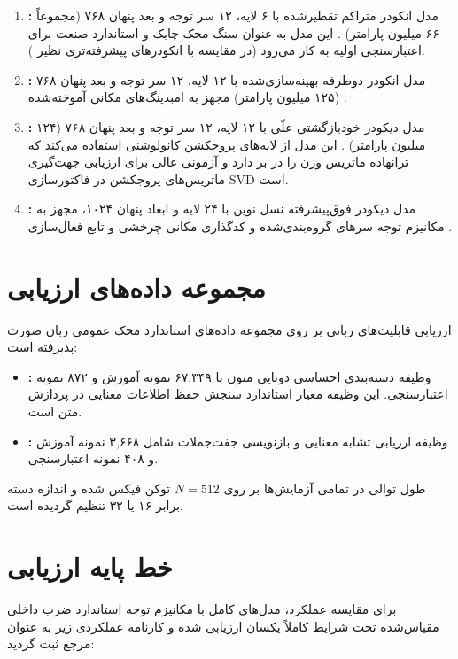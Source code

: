 \documentclass[12pt,a4paper]{report}
\theoremstyle{definition}
\begin{document}
\begin{enumerate}
    \item \textbf{:} مدل انکودر متراکم تقطیرشده با ۶ لایه، ۱۲ سر توجه و بعد پنهان ۷۶۸ (مجموعاً ۶۶ میلیون پارامتر) \cite{devlin2018bert}. این مدل به عنوان سنگ محک چابک و استاندارد صنعت برای اعتبارسنجی اولیه به کار می‌رود (در مقایسه با انکودرهای پیشرفته‌تری نظیر  \cite{he2021deberta}).
    \item \textbf{:} مدل انکودر دوطرفه بهینه‌سازی‌شده با ۱۲ لایه، ۱۲ سر توجه و بعد پنهان ۷۶۸ (۱۲۵ میلیون پارامتر) مجهز به امبدینگ‌های مکانی آموخته‌شده \cite{liu2019roberta}.
    \item \textbf{:} مدل دیکودر خودبازگشتی علّی با ۱۲ لایه، ۱۲ سر توجه و بعد پنهان ۷۶۸ (۱۲۴ میلیون پارامتر) \cite{radford2019language}. این مدل از لایه‌های پروجکشن کانولوشنی  استفاده می‌کند که ترانهاده ماتریس وزن را در بر دارد و آزمونی عالی برای ارزیابی جهت‌گیری ماتریس‌های پروجکشن در فاکتورسازی SVD است.
    \item \textbf{:} مدل دیکودر فوق‌پیشرفته نسل نوین با ۲۴ لایه و ابعاد پنهان ۱۰۲۴، مجهز به مکانیزم توجه سرهای گروه‌بندی‌شده  \cite{ainslie2023gqa} و کدگذاری مکانی چرخشی  \cite{su2024roformer} و تابع فعال‌سازی  \cite{bai2023qwen}.
\end{enumerate}

\section{مجموعه داده‌های ارزیابی }
ارزیابی قابلیت‌های زبانی بر روی مجموعه داده‌های استاندارد محک عمومی زبان  \cite{wang2018glue} صورت پذیرفته است:
\begin{itemize}
    \item \textbf{:} وظیفه دسته‌بندی احساسی دوتایی متون با ۶۷,۳۴۹ نمونه آموزش و ۸۷۲ نمونه اعتبارسنجی. این وظیفه معیار استاندارد سنجش حفظ اطلاعات معنایی در پردازش متن است.
    \item \textbf{:} وظیفه ارزیابی تشابه معنایی و بازنویسی جفت‌جملات شامل ۳,۶۶۸ نمونه آموزش و ۴۰۸ نمونه اعتبارسنجی.
\end{itemize}
طول توالی در تمامی آزمایش‌ها بر روی $N=512$ توکن فیکس شده و اندازه دسته  برابر ۱۶ یا ۳۲ تنظیم گردیده است.

\section{خط پایه ارزیابی }
برای مقایسه عملکرد، مدل‌های کامل با مکانیزم توجه استاندارد ضرب داخلی مقیاس‌شده  تحت شرایط کاملاً یکسان ارزیابی شده و کارنامه عملکردی زیر به عنوان مرجع ثبت گردید:
\end{document}
